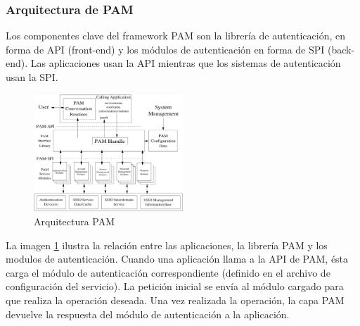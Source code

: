 \documentclass[titlepage, 12pt, a4paper]{article}
\begin{document}
\subsubsection{Arquitectura de PAM}
Los componentes clave del framework PAM son la librería de autenticación, en forma de \Gls{API} (\Gls{front-end}) y los módulos de autenticación en forma de \Gls{SPI} (\Gls{back-end}). Las aplicaciones usan la \Gls{API} mientras que los sistemas de autenticación usan la \Gls{SPI}.
\begin{figure}[H]
    \centering
    \includegraphics[width=0.5\textwidth]{Media/PAMFramework.png}
    \caption{Arquitectura PAM}
    \label{fig:arquitecturaPAM}
\end{figure}
La imagen \ref{fig:arquitecturaPAM} ilustra la relación entre las aplicaciones, la librería PAM y los modulos de autenticación. Cuando una aplicación llama a la API de PAM, ésta carga el módulo de autenticación correspondiente (definido en el archivo de configuración del servicio). La petición inicial se envía al módulo cargado para que realiza la operación deseada. Una vez realizada la operación, la capa PAM devuelve la respuesta del módulo de autenticación a la aplicación\cite{PAM}.
\end{document}
